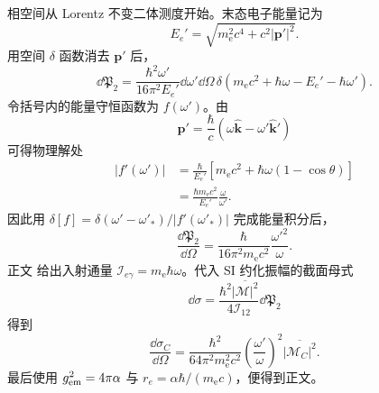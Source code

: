\begin{derivation}
相空间从 Lorentz 不变二体测度开始。末态电子能量记为
\begin{equation*}
 E_e'=\sqrt{m_{\mathrm e}^2c^4+c^2|\mathbf p'|^2}.
\end{equation*}
用空间 $\delta$ 函数消去 $\mathbf p'$ 后，
\begin{equation*}
 \dd\mathfrak P_2
 =\frac{\hbar^2\omega'}{16\pi^2E_e'}
 \dd\omega'\dd\Omega\,
 \delta\!\left(m_{\mathrm e} c^2+\hbar\omega-E_e'-\hbar\omega'\right).
\end{equation*}
令括号内的能量守恒函数为 $f(\omega')$。由
\begin{equation*}
 \mathbf p'=\frac{\hbar}{c}
 (\omega\hat{\mathbf k}-\omega'\hat{\mathbf k}')
\end{equation*}
可得物理解处
\begin{align*}
 |f'(\omega')|
 &=\frac{\hbar}{E_e'}
 \left[m_{\mathrm e} c^2+\hbar\omega(1-\cos\theta)\right]\\
 &=\frac{\hbar m_{\mathrm e} c^2}{E_e'}\frac\omega{\omega'}.
\end{align*}
因此用 $\delta[f]=\delta(\omega'-\omega'_*)/|f'(\omega'_*)|$ 完成能量积分后，
\begin{equation*}
 \frac{\dd\mathfrak P_2}{\dd\Omega}
 =\frac{\hbar}{16\pi^2m_{\mathrm e} c^2}\frac{\omega'^2}{\omega}.
\end{equation*}
正文 给出入射通量
$\mathcal I_{e\gamma}=m_{\mathrm e}\hbar\omega$。代入 SI 约化振幅的截面母式
\begin{equation*}
 \dd\sigma
 =\frac{\hbar^2\overline{|\mathcal M|^2}}{4\mathcal I_{12}}
 \dd\mathfrak P_2
\end{equation*}
得到
\begin{equation*}
 \frac{\dd\sigma_C}{\dd\Omega}
 =\frac{\hbar^2}{64\pi^2m_{\mathrm e}^2c^2}
 \left(\frac{\omega'}\omega\right)^2
 \overline{|\mathcal M_C|^2}.
\end{equation*}
最后使用 $g_{\rm em}^2=4\pi\alpha$ 与
$r_e=\alpha\hbar/(m_{\mathrm e} c)$，便得到正文。
\end{derivation}

